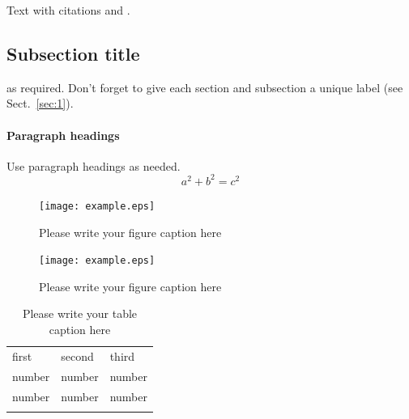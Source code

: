 Text with citations \cite{RefB} and \cite{RefJ}.

\subsection{Subsection title}
\label{sec:2}
as required. Don't forget to give each section
and subsection a unique label (see Sect.~\ref{sec:1}).
\paragraph{Paragraph headings} Use paragraph headings as needed.
\begin{equation}
a^2+b^2=c^2
\end{equation}

\begin{figure}
  \texttt{[image: example.eps]}
\caption{Please write your figure caption here}
\label{fig:1}       %
\end{figure}
%
\begin{figure}
  \texttt{[image: example.eps]}
\caption{Please write your figure caption here}
\label{fig:2}       %
\end{figure}
%
\begin{table}
\caption{Please write your table caption here}
\label{tab:1}       %
\begin{tabular}{lll}
\hline\noalign{\smallskip}
first & second & third  \\
\noalign{\smallskip}\hline\noalign{\smallskip}
number & number & number \\
number & number & number \\
\noalign{\smallskip}\hline
\end{tabular}
\end{table}




%
%


